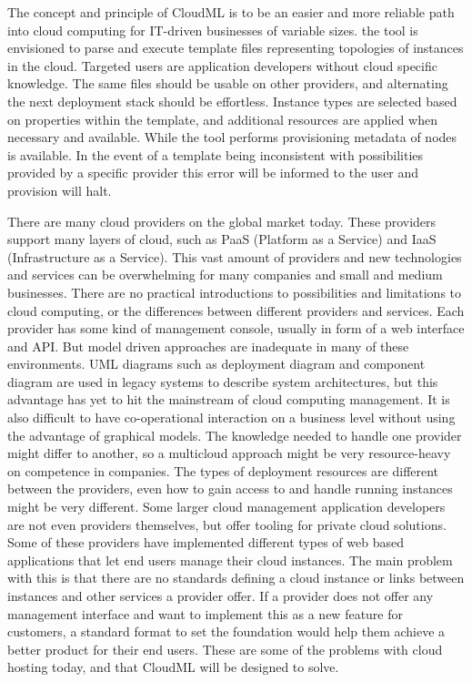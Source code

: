The concept and principle of CloudML is to be an easier and more reliable
path into cloud computing for IT-driven businesses of variable sizes.
the tool is envisioned to parse and execute template files representing topologies
of instances in the cloud. Targeted users are application developers without
cloud specific knowledge. The same files should be usable on other providers,
and alternating the next deployment stack should be effortless.
Instance types are selected based on properties within the template,
and additional resources are applied when necessary and available.
While the tool performs provisioning metadata of nodes is available.
In the event of a template being inconsistent with possibilities 
provided by a specific provider this error will be informed 
to the user and provision will halt.

There are many cloud providers on the global market today. These providers support many layers of cloud, 
such as PaaS (Platform as a Service) and IaaS (Infrastructure as a Service). 
This vast amount of providers and new technologies and services can be overwhelming for many companies and small and medium businesses. 
There are no practical introductions to possibilities and limitations to cloud computing, or the differences between different providers and services. 
Each provider has some kind of management console, usually in form of a web interface and API. 
But model driven approaches are inadequate in many of these environments. 
UML diagrams such as deployment diagram and component diagram are used in legacy systems to describe system architectures, 
but this advantage has yet to hit the mainstream of cloud computing management. 
It is also difficult to have co-operational interaction on a business level without using the advantage of graphical models.
The knowledge needed to handle one provider might differ to another, so a multicloud approach might be very resource-heavy on competence in companies. 
The types of deployment resources are different between the providers, even how to gain access to and handle running instances might be very different. 
Some larger cloud management application developers are not even providers themselves, but offer tooling for private cloud solutions.
Some of these providers have implemented different types of web based applications that let end users manage their cloud instances. 
The main problem with this is that there are no standards defining a cloud instance or links between instances and other services a provider offer.
If a provider does not offer any management interface and want to implement this as a new feature for customers, 
a standard format to set the foundation would help them achieve a better product for their end users.
These are some of the problems with cloud hosting today, and that CloudML will be designed to solve.
